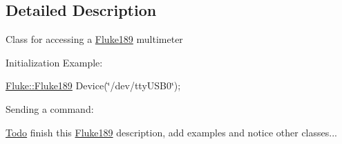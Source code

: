 \subsection{Detailed Description}
Class for accessing a \hyperlink{classFluke_1_1Fluke189}{Fluke189} multimeter\par


Initialization Example:\par
 \hyperlink{classFluke_1_1Fluke189}{Fluke::Fluke189} Device(\char`\"{}/dev/ttyUSB0\char`\"{});\par


Sending a command:\par
 \begin{Desc}
\item[\hyperlink{todo__todo000002}{Todo}]finish this \hyperlink{classFluke_1_1Fluke189}{Fluke189} description, add examples and notice other classes...\end{Desc}


